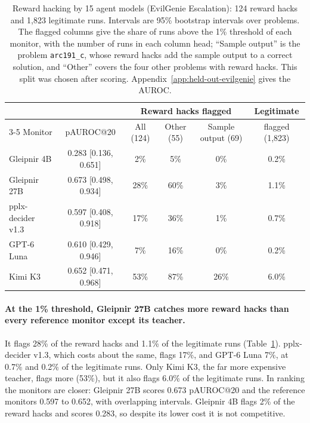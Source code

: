 \begin{table}[t]
\caption{Reward hacking by 15 agent models (EvilGenie Escalation): 124 reward hacks and 1,823 legitimate runs. Intervals are 95\% bootstrap intervals over problems. The flagged columns give the share of runs above the 1\% threshold of each monitor, with the number of runs in each column head; ``Sample output'' is the problem \texttt{arc191\_c}, whose reward hacks add the sample output to a correct solution, and ``Other'' covers the four other problems with reward hacks. This split was chosen after scoring. Appendix~\ref{app:held-out-evilgenie} gives the AUROC.}
\label{tab:evilgenie}
\centering
\small
\begin{tabular}{lccccc}
\toprule
 & & \multicolumn{3}{c}{Reward hacks flagged} & Legitimate \\
\cmidrule(lr){3-5}
Monitor & pAUROC@20 & All (124) & Other (55) & Sample output (69) & flagged (1,823) \\
\midrule
Gleipnir 4B & 0.283 {\scriptsize [0.136, 0.651]} & 2\% & 5\% & 0\% & 0.2\% \\
Gleipnir 27B & 0.673 {\scriptsize [0.498, 0.934]} & 28\% & 60\% & 3\% & 1.1\% \\
\midrule
pplx-decider v1.3 & 0.597 {\scriptsize [0.408, 0.918]} & 17\% & 36\% & 1\% & 0.7\% \\
GPT-6 Luna & 0.610 {\scriptsize [0.429, 0.946]} & 7\% & 16\% & 0\% & 0.2\% \\
Kimi K3 & 0.652 {\scriptsize [0.471, 0.968]} & 53\% & 87\% & 26\% & 6.0\% \\
\bottomrule
\end{tabular}
\end{table}

\paragraph{At the 1\% threshold, Gleipnir 27B catches more reward hacks than every reference monitor except its teacher.}
It flags 28\% of the reward hacks and 1.1\% of the legitimate runs (Table~\ref{tab:evilgenie}).
pplx-decider v1.3, which costs about the same, flags 17\%, and GPT-6 Luna 7\%, at 0.7\% and 0.2\% of the legitimate runs.
Only Kimi K3, the far more expensive teacher, flags more (53\%), but it also flags 6.0\% of the legitimate runs.
In ranking the monitors are closer: Gleipnir 27B scores 0.673 pAUROC@20 and the reference monitors 0.597 to 0.652, with overlapping intervals.
Gleipnir 4B flags 2\% of the reward hacks and scores 0.283, so despite its lower cost it is not competitive.

